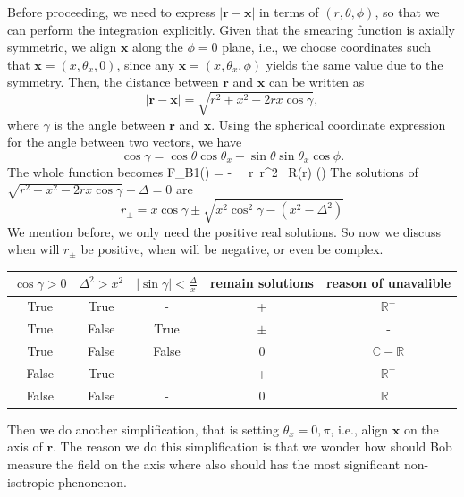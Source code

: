 \documentclass[a4paper,12pt]{article}
\begin{document}
Before proceeding, we need to express $|\mathbf{r} - \mathbf{x}|$ in terms of $(r, \theta, \phi)$, so that we can perform the integration explicitly. Given that the smearing function is axially symmetric, we align $\mathbf{x}$ along the $\phi = 0$ plane, i.e., we choose coordinates such that $\mathbf{x} = (x, \theta_x, 0)$, since any $\mathbf{x} = (x, \theta_x, \phi)$ yields the same value due to the symmetry. Then, the distance between $\mathbf{r}$ and $\mathbf{x}$ can be written as
\[
|\mathbf{r} - \mathbf{x}| = \sqrt{r^2 + x^2 - 2rx \cos\gamma},
\]
where $\gamma$ is the angle between $\mathbf{r}$ and $\mathbf{x}$. Using the spherical coordinate expression for the angle between two vectors, we have
\[
\cos\gamma = \cos\theta \cos\theta_x + \sin\theta \sin\theta_x \cos\phi.
\]
The whole function becomes
\be
    F_{B1}() = - \int {}\theta\, \phi\, r\, r^2 \, R(r) \delta(\theta) 
\ee
The solutions of $\sqrt{r^2 + x^2 - 2rx \cos\gamma} - \Delta = 0$ are
\[
    r_\pm = x\cos\gamma \pm \sqrt{x^2 \cos^2\gamma - (x^2 - \Delta^2)}
\]
We mention before, we only need the positive real solutions. So now we discuss when will $r_\pm$ be positive, when will be negative, or even be complex.
\begin{center}
  \begin{tabular}{|c|c|c|c|c|}
    \hline
    $\cos{\gamma} > 0$ & $\Delta^2 > x^2$ & $\left|\sin\gamma\right| < \frac{\Delta}{x}$ & remain solutions & reason of unavalible\\
    \hline\hline
    True & True & - & + & $\mathbb{R^-}$\\
    True & False & True & $\pm$ & -\\
    True & False & False & 0 & $\mathbb{C-R}$\\
    False & True & - & + & $\mathbb{R^-}$\\
    False & False & - & 0 & $\mathbb{R^-}$\\
    \hline
  \end{tabular}
\end{center}
Then we do another simplification, that is setting $\theta_x = 0, \pi$, i.e., align $\mathbf{x}$ on the axis of $\mathbf{r}$. The reason we do this simplification is that we wonder how should Bob measure the field on the axis where also should has the most significant non-isotropic phenonenon.
\end{document}
